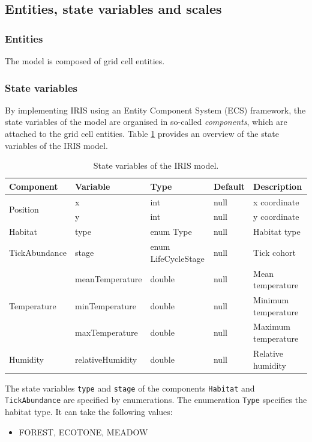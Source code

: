\documentclass[a4paper, 11pt]{scrartcl}
\newcommand{\inlinecode}[1]{\texttt{\small #1}}
\begin{document}
\subsection{Entities, state variables and scales}

\subsubsection{Entities}
The model is composed of grid cell entities.

\subsubsection{State variables}
By implementing IRIS using an Entity Component System (ECS) framework, the state variables of the model are organised in so-called \textit{components}, which are attached to the grid cell entities. Table \ref{tab:state_variables} provides an overview of the state variables of the IRIS model.

\begin{table}[H]
	\caption{State variables of the IRIS model.}
	\label{tab:state_variables}
	\begin{tabularx}{\textwidth}{lllll}
		\toprule
		\textbf{Component} & \textbf{Variable} & \textbf{Type} & \textbf{Default} & \textbf{Description} \\
		\midrule
		\multirow{2}{*}{Position} 	 & x  				& int  		& null & x coordinate \\
									 & y    			& int  		& null & y coordinate \\
		Habitat 				  	 & type 			& enum Type & null & Habitat type \\
		TickAbundance 			  	 & stage 			& enum LifeCycleStage  & null & Tick cohort \\
		\multirow{3}{*}{Temperature} & meanTemperature  & double  	& null & Mean temperature \\
									 & minTemperature   & double  	& null & Minimum temperature \\
									 & maxTemperature   & double  	& null & Maximum temperature \\
		Humidity 					 & relativeHumidity & double  	& null & Relative humidity \\
		\bottomrule
	\end{tabularx}
\end{table}

The state variables \inlinecode{type} and \inlinecode{stage} of the components \inlinecode{Habitat} and \inlinecode{TickAbundance} are specified by enumerations. The enumeration \inlinecode{Type} specifies the habitat type. It can take the following values:
\begin{small}
\begin{itemize}[noitemsep]
	\item FOREST, ECOTONE, MEADOW
\end{itemize}
\end{small}
\end{document}
